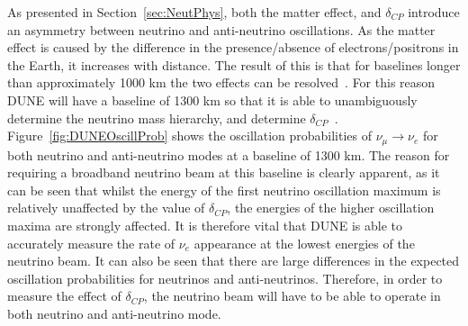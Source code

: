 As presented in Section~\ref{sec:NeutPhys}, both the matter effect, and $\delta_{CP}$ introduce an asymmetry between neutrino and anti-neutrino oscillations. As the matter effect is caused by the difference in the presence/absence of electrons/positrons in the Earth, it increases with distance. The result of this is that for baselines longer than approximately 1000 km the two effects can be resolved~\citep{Bass:2013vcg}. For this reason DUNE will have a baseline of 1300 km so that it is able to unambiguously determine the neutrino mass hierarchy, and determine $\delta_{CP}$~\citep{Diwan:2004bt}. \\

Figure~\ref{fig:DUNEOscillProb} shows the oscillation probabilities of $\nu_{\mu} \rightarrow \nu_{e}$ for both neutrino and anti-neutrino modes at a baseline of 1300 km. The reason for requiring a broadband neutrino beam at this baseline is clearly apparent, as it can be seen that whilst the energy of the first neutrino oscillation maximum is relatively unaffected by the value of $\delta_{CP}$, the energies of the higher oscillation maxima are strongly affected. It is therefore vital that DUNE is able to accurately measure the rate of $\nu_e$ appearance at the lowest energies of the neutrino beam. It can also be seen that there are large differences in the expected oscillation probabilities for neutrinos and anti-neutrinos. Therefore, in order to measure the effect of $\delta_{CP}$, the neutrino beam will have to be able to operate in both neutrino and anti-neutrino mode. \\

